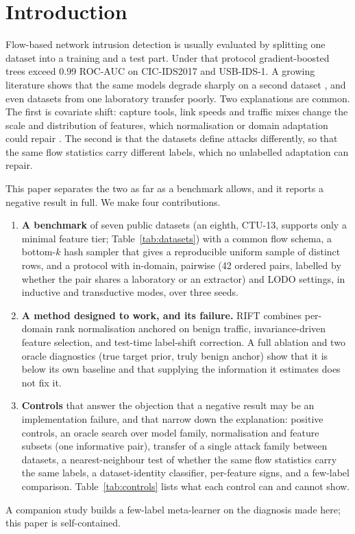 \documentclass[11pt]{article}
\begin{document}
\section{Introduction}
Flow-based network intrusion detection is usually evaluated by splitting one dataset into a training and a test part.
Under that protocol gradient-boosted trees exceed 0.99 ROC-AUC on CIC-IDS2017 and USB-IDS-1.
A growing literature shows that the same models degrade sharply on a second dataset \citep{layeghy2023explainable,cantone2024crossdataset,dhooge2020inter,dhooge2023damaged,apruzzese2022cross}, and even datasets from one laboratory transfer poorly.
Two explanations are common.
The first is covariate shift: capture tools, link speeds and traffic mixes change the scale and distribution of features, which normalisation or domain adaptation could repair \citep{ganin2016dann,sun2016coral,layeghy2023dinids}.
The second is that the datasets define attacks differently, so that the same flow statistics carry different labels, which no unlabelled adaptation can repair.

This paper separates the two as far as a benchmark allows, and it reports a negative result in full.
We make four contributions.
\begin{enumerate}
\item \textbf{A benchmark} of seven public datasets (an eighth, CTU-13, supports only a minimal feature tier; Table~\ref{tab:datasets}) with a common flow schema, a bottom-$k$ hash sampler that gives a reproducible uniform sample of distinct rows, and a protocol with in-domain, pairwise (42 ordered pairs, labelled by whether the pair shares a laboratory or an extractor) and LODO settings, in inductive and transductive modes, over three seeds.
\item \textbf{A method designed to work, and its failure.} RIFT combines per-domain rank normalisation anchored on benign traffic, invariance-driven feature selection, and test-time label-shift correction. A full ablation and two oracle diagnostics (true target prior, truly benign anchor) show that it is below its own baseline and that supplying the information it estimates does not fix it.
\item \textbf{Controls} that answer the objection that a negative result may be an implementation failure, and that narrow down the explanation: positive controls, an oracle search over model family, normalisation and feature subsets (one informative pair), transfer of a single attack family between datasets, a nearest-neighbour test of whether the same flow statistics carry the same labels, a dataset-identity classifier, per-feature signs, and a few-label comparison. Table~\ref{tab:controls} lists what each control can and cannot show.
\end{enumerate}
A companion study builds a few-label meta-learner on the diagnosis made here; this paper is self-contained.
\end{document}
